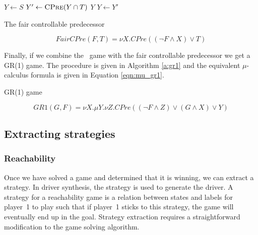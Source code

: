 \begin{algorithm}[t]
\begin{algorithmic}
\State $Y \gets S$
\Loop
\State $Y' \gets \Call{CPre}{Y \cap T}$
\State\Return $Y$\EndIf
\State $Y \gets Y'$
\EndLoop
\EndFunction
\end{algorithmic}
\caption{The fair controllable predecessor}
\label{a:fair_cpre}
\end{algorithm}

\begin{equation}
FairCPre(F, T) = \nu X. CPre((\neg F \wedge X) \vee T)
\label{eqn:mu_fair}
\end{equation}

Finally, if we combine the \buchi\ game with the fair controllable predecessor we get a GR(1) game. The procedure is given in Algorithm \ref{a:gr1} and the equivalent $\mu$-calculus formula is given in Equation \ref{eqn:mu_gr1}.

\begin{algorithm}[t]
\begin{algorithmic}
\State\Return {}
\EndFunction
\end{algorithmic}
\caption{GR(1) game}
\label{a:gr1}
\end{algorithm}

\begin{equation}
GR1(G, F) = \nu X. \mu Y. \nu Z. CPre((\neg F \wedge Z) \vee (G \wedge X) \vee Y)
\label{eqn:mu_gr1}
\end{equation}

\subsection{Extracting strategies}

\subsubsection{Reachability}

Once we have solved a game and determined that it is winning, we can extract a strategy. In driver synthesis, the strategy is used to generate the driver. A strategy for a reachability game is a relation between states and labels for player~1 to play such that if player~1 sticks to this strategy, the game will eventually end up in the goal. Strategy extraction requires a straightforward modification to the game solving algorithm.


